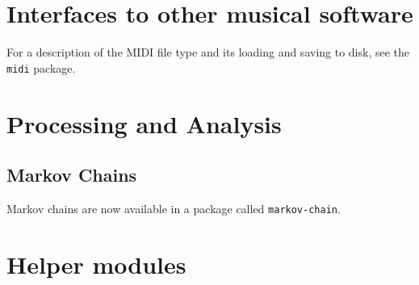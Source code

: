 \documentclass[11pt,fleqn]{article}
\newcommand{\extended}[1]{#1}
\newcommand{\basic}[1]{}
\begin{document}




\section{Interfaces to other musical software}



\basic{}
\extended{}


\basic{}

For a description of the MIDI file type
and its loading and saving to disk, see the \texttt{midi} package.

% 

% 



% 






\section{Processing and Analysis}


\subsection{Markov Chains}
Markov chains are now available in a package called \texttt{markov-chain}.




\pagebreak

\appendix

\section{Helper modules}
\end{document}
